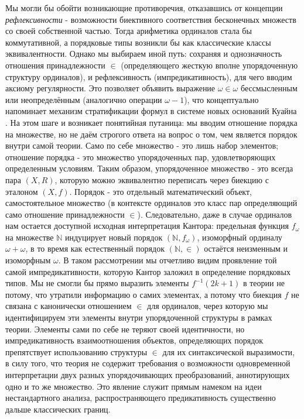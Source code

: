\documentclass[12pt]{article}
\begin{document}
Мы могли бы обойти возникающие противоречия, отказавшись от концепции {\it рефлексивности} - возможности биективного соответствия бесконечных множеств со своей собственной частью. Тогда арифметика ординалов стала бы коммутативной, а порядковые типы возникли бы как классические классы эквивалентности. Однако мы выбираем иной путь: сохраняя и однозначность отношения принадлежности $\in$ (определяющего жесткую вполне упорядоченную структуру ординалов), и рефлексивность (импредикативность), для чего вводим аксиому регулярности. Это позволяет объявить выражение $\omega \in \omega$ бессмысленным или неопределённым (аналогично операции $\omega - 1$), что концептуально напоминает механизм стратификации формул в системе новых оснований Куайна \cite{quine-new-foundations}. На этом шаге и возникает понятийная путаница: мы вводим отношение порядка на множестве, но не даём строгого ответа на вопрос о том, чем является порядок внутри самой теории. Само по себе множество - это лишь набор элементов; отношение порядка - это множество упорядоченных пар, удовлетворяющих определенным условиям. Таким образом, упорядоченное множество - это всегда пара $(X, R)$, которую можно эквивалентно переписать через биекцию с эталоном $(X, f)$. Порядок - это отдельный математический объект, самостоятельное множество (в контексте ординалов это класс пар определяющий само отношение принадлежности $\in$). Следовательно, даже в случае ординалов нам остается доступной исходная интерпретация Кантора: предельная функция $f_{\omega}$ на множестве $\mathbb{N}$ индуцирует новый порядок $(\mathbb{N}, f_{\omega})$, изоморфный ординалу $\omega + \omega$, в то время как естественный порядок $(\mathbb{N}, \in)$ остаётся неизменным и изоморфным $\omega$. В таком рассмотрении мы отчетливо видим проявление той самой импредикативности, которую Кантор заложил в определение порядковых типов. Мы не смогли бы прямо выразить элементы $f^{-1}(2k + 1)$ в теории не потому, что утратили информацию о самих элементах, а потому что биекция $f$ не связана с канонически отношением $\in$ для ординалов, через которую мы идентифицируем эти элементы внутри упорядоченной структуры в рамках теории. Элементы сами по себе не теряют своей идентичности, но импредикативность взаимоотношения объектов, определяющих порядок препятствует использованию структуры $\in$ для их синтаксической выразимости, в силу того, что теория не содержит требования о возможности одновременной интерпретации двух разных упорядочивающих преобразований, аннотирующих одно и то же множество. Это явление служит прямым намеком на идеи нестандартного анализа, распространяющего предикативность существенно дальше классических границ. 
\end{document}
